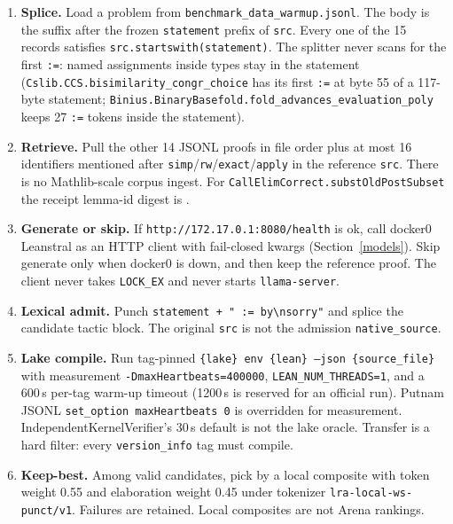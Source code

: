 \documentclass{article}
\begin{document}
\begin{enumerate}
  \item \textbf{Splice.} Load a problem from \texttt{benchmark\_data\_warmup.jsonl}. The body is the suffix after the frozen \texttt{statement} prefix of \texttt{src}. Every one of the 15 records satisfies \texttt{src.startswith(statement)}. The splitter never scans for the first \texttt{:=}: named assignments inside types stay in the statement (\texttt{Cslib.CCS.bisimilarity\_congr\_choice} has its first \texttt{:=} at byte 55 of a 117-byte statement; \texttt{Binius.BinaryBasefold.fold\_advances\_evaluation\_poly} keeps 27 \texttt{:=} tokens inside the statement).
  \item \textbf{Retrieve.} Pull the other 14 JSONL proofs in file order plus at most 16 identifiers mentioned after \texttt{simp}/\texttt{rw}/\texttt{exact}/\texttt{apply} in the reference \texttt{src}. There is no Mathlib-scale corpus ingest. For \texttt{CallElimCorrect.substOldPostSubset} the receipt lemma-id digest is .
  \item \textbf{Generate or skip.} If \texttt{http://172.17.0.1:8080/health} is ok, call docker0 Leanstral as an HTTP client with fail-closed kwargs (Section~\ref{models}). Skip generate only when docker0 is down, and then keep the reference proof. The client never takes \texttt{LOCK\_EX} and never starts \texttt{llama-server}.
  \item \textbf{Lexical admit.} Punch \texttt{statement + " := by\textbackslash nsorry"} and splice the candidate tactic block. The original \texttt{src} is not the admission \texttt{native\_source}.
  \item \textbf{Lake compile.} Run tag-pinned \texttt{\{lake\} env \{lean\} --json \{source\_file\}} with measurement \texttt{-DmaxHeartbeats=400000}, \texttt{LEAN\_NUM\_THREADS=1}, and a 600\,s per-tag warm-up timeout (1200\,s is reserved for an official run). Putnam JSONL \texttt{set\_option maxHeartbeats 0} is overridden for measurement. IndependentKernelVerifier's 30\,s default is not the lake oracle. Transfer is a hard filter: every \texttt{version\_info} tag must compile.
  \item \textbf{Keep-best.} Among valid candidates, pick by a local composite with token weight 0.55 and elaboration weight 0.45 under tokenizer \texttt{lra-local-ws-punct/v1}. Failures are retained. Local composites are not Arena rankings.
\end{enumerate}
\end{document}
